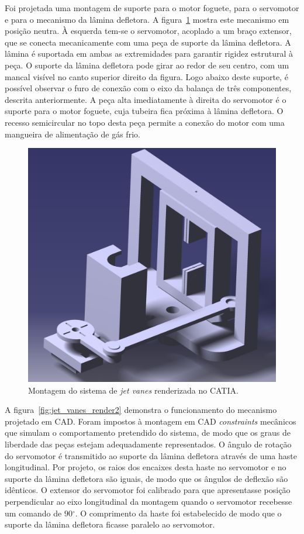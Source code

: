 Foi projetada uma montagem de suporte para o motor foguete, para o servomotor e para o mecanismo da lâmina defletora. A figura~\ref{fig:jet_vanes_render1} mostra este mecanismo em posição neutra. À esquerda tem-se o servomotor, acoplado a um braço extensor, que se conecta mecanicamente com uma peça de suporte da lâmina defletora. A lâmina é suportada em ambas as extremidades para garantir rigidez estrutural à peça. O suporte da lâmina defletora pode girar ao redor de seu centro, com um mancal visível no canto superior direito da figura. Logo abaixo deste suporte, é possível observar o furo de conexão com o eixo da balança de três componentes, descrita anteriormente. A peça alta imediatamente à direita do servomotor é o suporte para o motor foguete, cuja tubeira fica próxima à lâmina defletora. O recesso semicircular no topo desta peça permite a conexão do motor com uma mangueira de alimentação de gás frio.

\begin{figure}[htbp]
    \centering
    \includegraphics[width=\textwidth]{img/tvc_assembly_render1.png}
    \caption{Montagem do sistema de \textit{jet vanes} renderizada no CATIA.}\label{fig:jet_vanes_render1}
\end{figure}

A figura~\ref{fig:jet_vanes_render2} demonstra o funcionamento do mecanismo projetado em CAD\@. Foram impostos à montagem em CAD \textit{constraints} mecânicos que simulam o comportamento pretendido do sistema, de modo que os graus de liberdade das peças estejam adequadamente representados. O ângulo de rotação do servomotor é transmitido ao suporte da lâmina defletora através de uma haste longitudinal. Por projeto, os raios dos encaixes desta haste no servomotor e no suporte da lâmina defletora são iguais, de modo que os ângulos de deflexão são idênticos. O extensor do servomotor foi calibrado para que apresentasse posição perpendicular ao eixo longitudinal da montagem quando o servomotor recebesse um comando de \(90\mathrm{^\circ}\). O comprimento da haste foi estabelecido de modo que o suporte da lâmina defletora ficasse paralelo ao servomotor.

